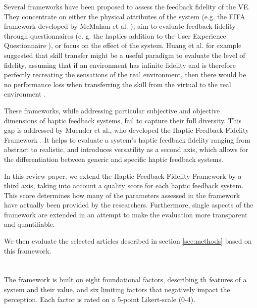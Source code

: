 Several frameworks have been proposed to assess the feedback fidelity of the VE. They concentrate on either the physical attributes of the system (e.g. the FIFA framework developed by McMahan et al. \cite{McMahan2011ExploringGames}), aim to evaluate feedback fidelity through questionnaires (e. g. the haptics addition \cite{Boos2017ErweiterungHaptik} to the User Experience Questionnaire \cite{Laugwitz2008ConstructionQuestionnaire}), or focus on the effect of the system. Huang et al. for example suggested that skill transfer might be a useful paradigm to evaluate the level of fidelity, assuming that if an environment has infinite fidelity and is therefore perfectly recreating the sensations of the real environment, then there would be no performance loss when transferring the skill from the virtual to the real environment \cite{Huang2006}.

These frameworks, while addressing particular subjective and objective dimensions of haptic feedback systems, fail to capture their full diversity. This gap is addressed by Muender et al., who developed the Haptic Feedback Fidelity Framework \cite{Muender2022HapticReality}.
It helps to evaluate a system's haptic feedback fidelity ranging from abstract to realistic, and introduces versatility as a second axis, which allows for the differentiation between generic and specific haptic feedback systems.

In this review paper, we extend the Haptic Feedback Fidelity Framework by a third axis, taking into account a quality score for each haptic feedback system. This score determines how many of the parameters assessed in the framework have actually been provided by the researchers. Furthermore, single aspects of the framework are extended in an attempt to make the evaluation more transparent and quantifiable. 

We then evaluate the selected articles described in section \ref{sec:methods}  based on this framework.

\section{}

The framework is built on eight foundational factors, describing th features of a system and their value, and six limiting factors that negatively impact the perception. Each factor is rated on a 5-point Likert-scale (0-4).

\subsection{}
